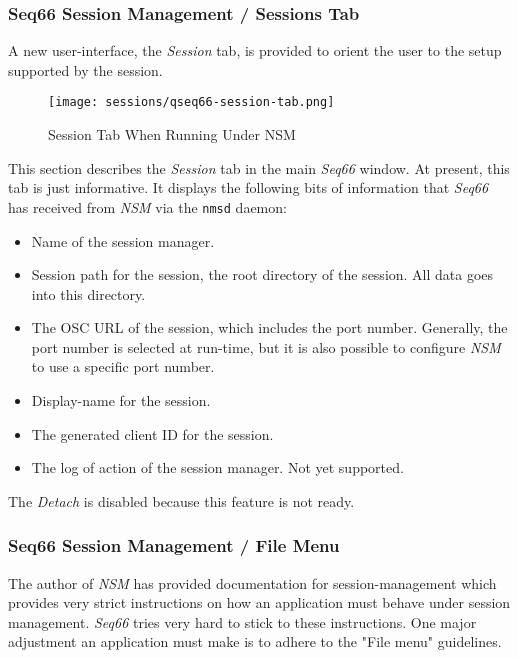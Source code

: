 \subsubsection{Seq66 Session Management / Sessions Tab}
\label{subsubsec:sessions_tab}

   A new user-interface, the \textsl{Session} tab, is provided to orient the
   user to the setup supported by the session.

\begin{figure}[H]
   \centering 
   \texttt{[image: sessions/qseq66-session-tab.png]}
   \caption*{Session Tab When Running Under NSM}
\end{figure}

   This section describes the \textsl{Session} tab in the main
   \textsl{Seq66} window.  At present, this tab is just informative.  It
   displays the following bits of information that \textsl{Seq66} has received
   from \textsl{NSM} via the \texttt{nmsd} daemon:

   \begin{itemize}
      \item Name of the session manager.
      \item Session path for the session, the root directory of the session.
         All data goes into this directory.
      \item The OSC URL of the session, which includes the port number.
         Generally, the port number is selected at run-time, but it is also
         possible to configure \textsl{NSM} to use a specific port number.
      \item Display-name for the session.
      \item The generated client ID for the session.
      \item The log of action of the session manager. Not yet supported.
   \end{itemize}

   The \textsl{Detach} is disabled because this feature is not ready.

\subsubsection{Seq66 Session Management / File Menu}
\label{subsubsec:sessions_file_menu}

   The author of \textsl{NSM} has provided documentation for session-management
   which provides very strict instructions on how an application must behave
   under session management.  \textsl{Seq66} tries very hard to stick to these
   instructions.  One major adjustment an application must make is to adhere to
   the "File menu" guidelines.

